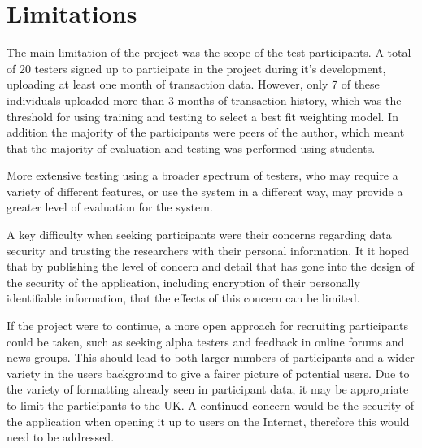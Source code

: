 


\section{Limitations} \label{sec:limitations}
The main limitation of the project was the scope of the test participants. A total of 20 testers signed up to participate in the project during it's development, uploading at least one month of transaction data. However, only 7 of these individuals uploaded more than 3 months of transaction history, which was the threshold for using training and testing to select a best fit weighting model. In addition the majority of the participants were peers of the author, which meant that the majority of evaluation and testing was performed using students.

More extensive testing using a broader spectrum of testers, who may require a variety of different features, or use the system in a different way, may provide a greater level of evaluation for the system.

A key difficulty when seeking participants were their concerns regarding data security and trusting the researchers with their personal information. It it hoped that by publishing the level of concern and detail that has gone into the design of the security of the application, including encryption of their personally identifiable information, that the effects of this concern can be limited.

If the project were to continue, a more open approach for recruiting participants could be taken, such as seeking alpha testers and feedback in online forums and news groups. This should lead to both larger numbers of participants and a wider variety in the users background to give a fairer picture of potential users. Due to the variety of formatting already seen in participant data, it may be appropriate to limit the participants to the UK. A continued concern would be the security of the application when opening it up to users on the Internet, therefore this would need to be addressed.

